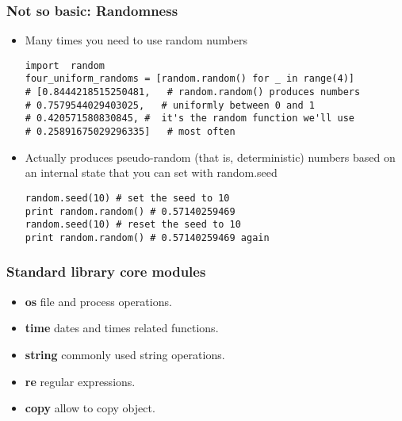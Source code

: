 \begin{frame}[fragile]\frametitle{Not so basic: Randomness}
  \begin{itemize}
  \item Many times you need to use random numbers
  \begin{lstlisting}
import	random
four_uniform_randoms = [random.random() for _ in range(4)]
# [0.8444218515250481,	 # random.random() produces numbers
# 0.7579544029403025,	# uniformly between 0 and 1
# 0.420571580830845, #	it's the random function we'll use
# 0.25891675029296335]	 # most often
  \end{lstlisting}
\item 	Actually produces pseudo-random	(that is, deterministic) numbers based on an internal state that you can set with random.seed	
  \begin{lstlisting}
random.seed(10) # set the seed to 10
print random.random() # 0.57140259469 
random.seed(10) # reset the seed to 10
print random.random() # 0.57140259469 again
  \end{lstlisting}
  \end{itemize}
\end{frame}



\begin{frame}[fragile]\frametitle{Standard library core modules}
  \begin{itemize}
  \item \textbf{os} file and process operations.
  \item \textbf{time} dates and times related functions.
  \item \textbf{string} commonly used string operations.
  \item \textbf{re} regular expressions.
  \item \textbf{copy} allow to copy object.
  \end{itemize}
\end{frame}

